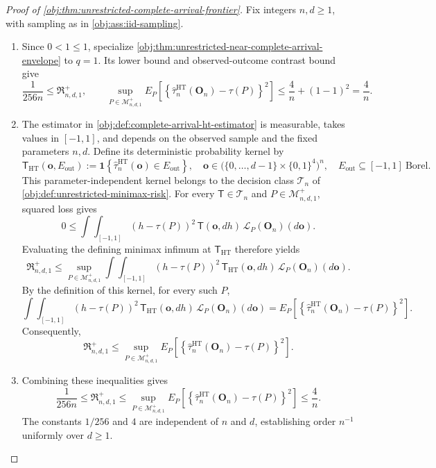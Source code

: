 \begin{proof}[Proof of \cref{obj:thm:unrestricted-complete-arrival-frontier}]
Fix integers \(n,d\ge1\), with sampling as in \cref{obj:ass:iid-sampling}.

\begin{enumerate}
\item Since \(0<1\le1\), specialize \cref{obj:thm:unrestricted-near-complete-arrival-envelope} to \(q=1\). Its lower bound and observed-outcome contrast bound give
\[
\frac{1}{256n}\le \mathfrak R^{+}_{n,d,1},
\qquad
\sup_{P\in\mathcal M^{+}_{n,d,1}}
E_P\!\left[
\left\{\widehat\tau^{\mathrm{HT}}_n(\mathbf O_n)-\tau(P)\right\}^{2}
\right]
\le \frac4n+(1-1)^2=\frac4n.
\]

\item The estimator in \cref{obj:def:complete-arrival-ht-estimator} is measurable, takes values in \([-1,1]\), and depends on the observed sample and the fixed parameters \(n,d\). Define its deterministic probability kernel by
\[
\mathsf T_{\mathrm{HT}}(\mathbf o,E_{\mathrm{out}})
:=
\mathbf 1\!\left\{
\widehat\tau^{\mathrm{HT}}_n(\mathbf o)\in E_{\mathrm{out}}
\right\},
\quad
\mathbf o\in
\bigl(\{0,\ldots,d-1\}\times\{0,1\}^{4}\bigr)^n,
\quad
E_{\mathrm{out}}\subseteq[-1,1]\ \text{Borel}.
\]
This parameter-independent kernel belongs to the decision class \(\mathcal T_n\) of \cref{obj:def:unrestricted-minimax-risk}. For every \(\mathsf T\in\mathcal T_n\) and \(P\in\mathcal M^{+}_{n,d,1}\), squared loss gives
\[
0\le
\int\!\int_{[-1,1]}
(h-\tau(P))^2\,
\mathsf T(\mathbf o,dh)\,
\mathcal L_P(\mathbf O_n)(d\mathbf o).
\]
Evaluating the defining minimax infimum at \(\mathsf T_{\mathrm{HT}}\) therefore yields
\[
\mathfrak R^{+}_{n,d,1}
\le
\sup_{P\in\mathcal M^{+}_{n,d,1}}
\int\!\int_{[-1,1]}
(h-\tau(P))^2\,
\mathsf T_{\mathrm{HT}}(\mathbf o,dh)\,
\mathcal L_P(\mathbf O_n)(d\mathbf o).
\]
By the definition of this kernel, for every such \(P\),
\[
\int\!\int_{[-1,1]}
(h-\tau(P))^2\,
\mathsf T_{\mathrm{HT}}(\mathbf o,dh)\,
\mathcal L_P(\mathbf O_n)(d\mathbf o)
=
E_P\!\left[
\left\{\widehat\tau^{\mathrm{HT}}_n(\mathbf O_n)-\tau(P)\right\}^{2}
\right].
\]
Consequently,
\[
\mathfrak R^{+}_{n,d,1}
\le
\sup_{P\in\mathcal M^{+}_{n,d,1}}
E_P\!\left[
\left\{\widehat\tau^{\mathrm{HT}}_n(\mathbf O_n)-\tau(P)\right\}^{2}
\right].
\]

\item Combining these inequalities gives
\[
\frac{1}{256n}
\le \mathfrak R^{+}_{n,d,1}
\le
\sup_{P\in\mathcal M^{+}_{n,d,1}}
E_P\!\left[
\left\{\widehat\tau^{\mathrm{HT}}_n(\mathbf O_n)-\tau(P)\right\}^{2}
\right]
\le \frac4n.
\]
The constants \(1/256\) and \(4\) are independent of \(n\) and \(d\), establishing order \(n^{-1}\) uniformly over \(d\ge1\).
\end{enumerate}
\end{proof}

